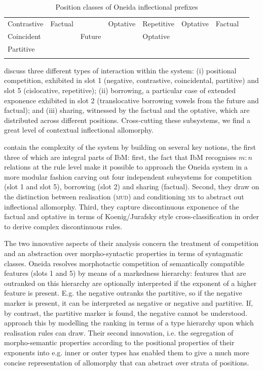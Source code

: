 \documentclass[output=paper
                ,modfonts
                ,nonflat
	        ,collection
	        ,collectionchapter
	        ,collectiontoclongg
 	        ,biblatex
                ,babelshorthands
                ,newtxmath
                ,draftmode
                ,colorlinks, citecolor=brown
]{./langsci/langscibook}
\begin{document}
{\begin{table}[htb]
\begin{tabular}{l|l|l|l|l|l|l|l}
    Contrastive & Factual & & Optative & Repetitive & Optative &
                                                                 Factual
                 & \\
    Coincident & & Future & & Optative & &  \\
    Partitive & & & & & & &\\
    \lspbottomrule
  \end{tabular}
  \caption{Position classes of Oneida inflectional prefixes}
  \label{tab:Oneida}
\end{table}

\citet{diaz:koenig:michelson:19} discuss three different types of
interaction within the system: (i) positional competition, exhibited
in slot 1 (negative, contrastive, coincidental, partitive) and slot 5
(cislocative, repetitive); (ii) borrowing, a particular case of extended
exponence exhibited in slot 2 (translocative borrowing vowels from the
future and factual); and (iii) sharing, witnessed by the factual and
the optative, which are distributed across different positions. Cross-cutting these subsystems, we find a great level of
contextual inflectional allomorphy.

\citet{diaz:koenig:michelson:19} contain the complexity of the system
by building on several key notions, the first three of
which are integral parts of IbM: first, the fact that IbM recognises
$m:n$ relations at the rule level make it possible to approach the
Oneida system in a more modular fashion carving out four independent
subsystems for competition (slot 1 and slot 5), borrowing (slot 2) and
sharing (factual). Second, they draw on the distinction between
realisation (\textsc{mud}) and conditioning \textsc{ms} to abstract
out inflectional allomorphy. Third, they capture discontinuous
exponence of the factual and optative in terms of Koenig/Jurafsky
style cross-classification in order to derive complex discontinuous
rules.

The two innovative aspects of their analysis concern the treatment of
competition and an abstraction over morpho-syntactic properties in
terms of syntagmatic classes. Oneida resolves morphotactic competition
of semantically compatible features (slots 1 and 5) by means of a
markedness hierarchy: features that are outranked on this hierarchy
are optionally interpreted if the exponent of a higher feature is
present. E.g. the negative outranks the partitive, so if the negative
marker is present, it can be interpreted as negative or negative and
partitive. If, by contrast, the partitive marker is found, the
negative cannot be understood.  \citet{diaz:koenig:michelson:19}
approach this by modelling the ranking in terms of a type hierarchy
upon which realisation rules can draw. Their second innovation, i.e. 
the  segregation of morpho-semantic properties according to
the positional properties of their exponents into e.g. inner or outer
types has enabled them to give a much more concise representation of
allomorphy that can abstract over strata of positions. 

}
\end{document}
